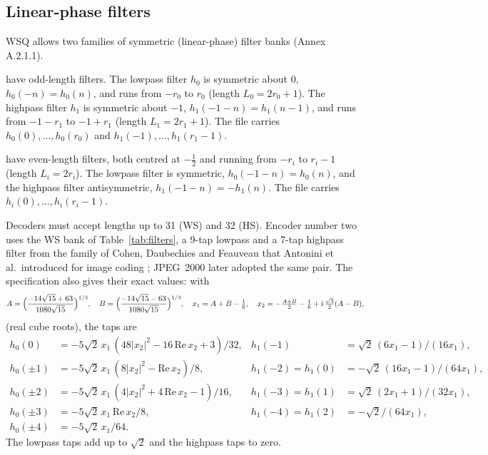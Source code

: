 \subsection{Linear-phase filters}

WSQ allows two families of symmetric (linear-phase) filter banks (Annex A.2.1.1).
\begin{description}[leftmargin=0pt]
  \item[Whole-sample symmetric (WS) banks] have odd-length filters. The lowpass filter $h_0$
    is symmetric about $0$, $h_0(-n) = h_0(n)$, and runs from $-r_0$ to $r_0$ (length
    $L_0 = 2r_0+1$). The highpass filter $h_1$ is symmetric about $-1$,
    $h_1(-1-n) = h_1(n-1)$, and runs from $-1-r_1$ to $-1+r_1$ (length $L_1 = 2r_1+1$).
    The file carries $h_0(0),\dots,h_0(r_0)$ and $h_1(-1),\dots,h_1(r_1-1)$.
  \item[Half-sample symmetric (HS) banks] have even-length filters, both centred at
    $-\tfrac12$ and running from $-r_i$ to $r_i - 1$ (length $L_i = 2r_i$). The lowpass
    filter is symmetric, $h_0(-1-n) = h_0(n)$, and the highpass filter antisymmetric,
    $h_1(-1-n) = -h_1(n)$. The file carries $h_i(0),\dots,h_i(r_i-1)$.
\end{description}
Decoders must accept lengths up to 31 (WS) and 32 (HS). Encoder number two uses the WS bank
of Table~\ref{tab:filters}, a 9-tap lowpass and a 7-tap highpass filter from the family of
Cohen, Daubechies and Feauveau that Antonini et al.\ introduced for image coding
\cite{antonini1992}; JPEG~2000 later adopted the same pair. The specification also gives
their exact values: with
\begin{equation*}
  A = \Bigl(\frac{-14\sqrt{15}+63}{1080\sqrt{15}}\Bigr)^{1/3},\quad
  B = \Bigl(\frac{-14\sqrt{15}-63}{1080\sqrt{15}}\Bigr)^{1/3},\quad
  x_1 = A + B - \tfrac16,\quad
  x_2 = -\tfrac{A+B}{2} - \tfrac16 + \mathrm{i}\,\tfrac{\sqrt3}{2}(A-B),
\end{equation*}
(real cube roots), the taps are
\begin{align*}
  h_0(0)     &= -5\sqrt2\,x_1\,(48|x_2|^2 - 16\,\mathrm{Re}\,x_2 + 3)/32, &
  h_1(-1)    &= \sqrt2\,(6x_1-1)/(16x_1),\\
  h_0(\pm1)  &= -5\sqrt2\,x_1\,(8|x_2|^2 - \mathrm{Re}\,x_2)/8, &
  h_1(-2) = h_1(0) &= -\sqrt2\,(16x_1-1)/(64x_1),\\
  h_0(\pm2)  &= -5\sqrt2\,x_1\,(4|x_2|^2 + 4\,\mathrm{Re}\,x_2 - 1)/16, &
  h_1(-3) = h_1(1) &= \sqrt2\,(2x_1+1)/(32x_1),\\
  h_0(\pm3)  &= -5\sqrt2\,x_1\,\mathrm{Re}\,x_2/8, &
  h_1(-4) = h_1(2) &= -\sqrt2/(64x_1),\\
  h_0(\pm4)  &= -5\sqrt2\,x_1/64.
\end{align*}
The lowpass taps add up to $\sqrt2$ and the highpass taps to zero.

